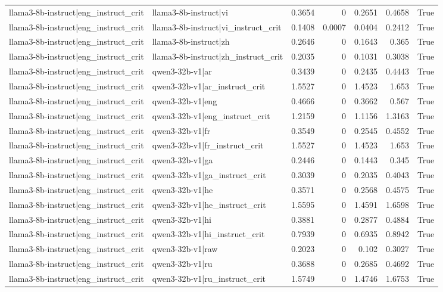 \begin{table}
\begin{tabular}{l l r r r r l}
llama3-8b-instruct|eng_instruct_crit & llama3-8b-instruct|vi & 0.3654 & 0 & 0.2651 & 0.4658 & True \\
llama3-8b-instruct|eng_instruct_crit & llama3-8b-instruct|vi_instruct_crit & 0.1408 & 0.0007 & 0.0404 & 0.2412 & True \\
llama3-8b-instruct|eng_instruct_crit & llama3-8b-instruct|zh & 0.2646 & 0 & 0.1643 & 0.365 & True \\
llama3-8b-instruct|eng_instruct_crit & llama3-8b-instruct|zh_instruct_crit & 0.2035 & 0 & 0.1031 & 0.3038 & True \\
llama3-8b-instruct|eng_instruct_crit & qwen3-32b-v1|ar & 0.3439 & 0 & 0.2435 & 0.4443 & True \\
llama3-8b-instruct|eng_instruct_crit & qwen3-32b-v1|ar_instruct_crit & 1.5527 & 0 & 1.4523 & 1.653 & True \\
llama3-8b-instruct|eng_instruct_crit & qwen3-32b-v1|eng & 0.4666 & 0 & 0.3662 & 0.567 & True \\
llama3-8b-instruct|eng_instruct_crit & qwen3-32b-v1|eng_instruct_crit & 1.2159 & 0 & 1.1156 & 1.3163 & True \\
llama3-8b-instruct|eng_instruct_crit & qwen3-32b-v1|fr & 0.3549 & 0 & 0.2545 & 0.4552 & True \\
llama3-8b-instruct|eng_instruct_crit & qwen3-32b-v1|fr_instruct_crit & 1.5527 & 0 & 1.4523 & 1.653 & True \\
llama3-8b-instruct|eng_instruct_crit & qwen3-32b-v1|ga & 0.2446 & 0 & 0.1443 & 0.345 & True \\
llama3-8b-instruct|eng_instruct_crit & qwen3-32b-v1|ga_instruct_crit & 0.3039 & 0 & 0.2035 & 0.4043 & True \\
llama3-8b-instruct|eng_instruct_crit & qwen3-32b-v1|he & 0.3571 & 0 & 0.2568 & 0.4575 & True \\
llama3-8b-instruct|eng_instruct_crit & qwen3-32b-v1|he_instruct_crit & 1.5595 & 0 & 1.4591 & 1.6598 & True \\
llama3-8b-instruct|eng_instruct_crit & qwen3-32b-v1|hi & 0.3881 & 0 & 0.2877 & 0.4884 & True \\
llama3-8b-instruct|eng_instruct_crit & qwen3-32b-v1|hi_instruct_crit & 0.7939 & 0 & 0.6935 & 0.8942 & True \\
llama3-8b-instruct|eng_instruct_crit & qwen3-32b-v1|raw & 0.2023 & 0 & 0.102 & 0.3027 & True \\
llama3-8b-instruct|eng_instruct_crit & qwen3-32b-v1|ru & 0.3688 & 0 & 0.2685 & 0.4692 & True \\
llama3-8b-instruct|eng_instruct_crit & qwen3-32b-v1|ru_instruct_crit & 1.5749 & 0 & 1.4746 & 1.6753 & True \\

\end{tabular}
\end{table}
